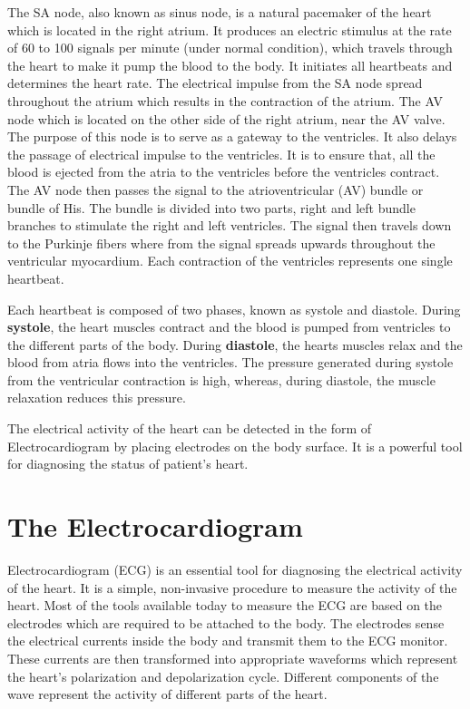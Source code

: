 The SA node, also known as sinus node, is a natural pacemaker of the heart which is located in the right atrium. It produces an electric stimulus at the rate of 60 to 100 signals per minute (under normal condition), which travels through the heart to make it pump the blood to the body. It initiates all heartbeats and determines the heart rate. The electrical impulse from the SA node spread throughout the atrium which results in the contraction of the atrium. The AV node which is located on the other side of the right atrium, near the AV valve. The purpose of this node is to serve as a gateway to the ventricles. It also delays the passage of electrical impulse to the ventricles. It is to ensure that, all the blood is ejected from the atria to the ventricles before the ventricles contract. The AV node then passes the signal to the atrioventricular (AV) bundle or bundle of His. The bundle is divided into two parts, right and left bundle branches to stimulate the right and left ventricles. The signal then travels down to the Purkinje fibers where from the signal spreads upwards throughout the ventricular myocardium. Each contraction of the ventricles represents one single heartbeat.

Each heartbeat is composed of two phases, known as systole and diastole. During \textbf{systole}, the heart muscles contract and the blood is pumped from ventricles to the different parts of the body. During \textbf{diastole}, the hearts muscles relax and the blood from atria flows into the ventricles. The pressure generated during systole from the ventricular contraction is high, whereas, during diastole, the muscle relaxation reduces this pressure.

The electrical activity of the heart can be detected in the form of Electrocardiogram by placing electrodes on the body surface. It is a powerful tool for diagnosing the status of patient's heart.



\section{The Electrocardiogram} \label{the_electrocardiogram}

Electrocardiogram (ECG) is an essential tool for diagnosing the electrical activity of the heart. It is a simple, non-invasive procedure to measure the activity of the heart. Most of the tools available today to measure the ECG are based on the electrodes which are required to be attached to the body. The electrodes sense the electrical currents inside the body and transmit them to the ECG monitor. These currents are then transformed into appropriate waveforms which represent the heart's polarization and depolarization cycle. Different components of the wave represent the activity of different parts of the heart.


